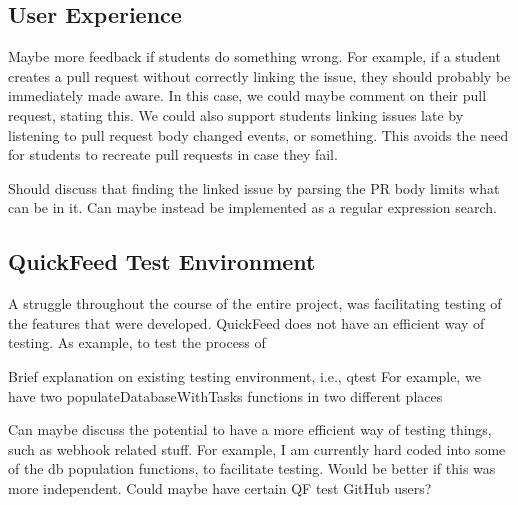 \subsection{User Experience}

Maybe more feedback if students do something wrong.
For example, if a student creates a pull request without correctly linking the issue, they should probably be immediately made aware.
In this case, we could maybe comment on their pull request, stating this.
We could also support students linking issues late by listening to pull request body changed events, or something.
This avoids the need for students to recreate pull requests in case they fail.

Should discuss that finding the linked issue by parsing the PR body limits what can be in it.
Can maybe instead be implemented as a regular expression search.

\subsection{QuickFeed Test Environment}

A struggle throughout the course of the entire project, was facilitating testing of the features that were developed.
QuickFeed does not have an efficient way of testing.
As example, to test the process of 

Brief explanation on existing testing environment, i.e., qtest
For example, we have two populateDatabaseWithTasks functions in two different places

Can maybe discuss the potential to have a more efficient way of testing things, such as webhook related stuff.
For example, I am currently hard coded into some of the db population functions, to facilitate testing.
Would be better if this was more independent. 
Could maybe have certain QF test GitHub users?